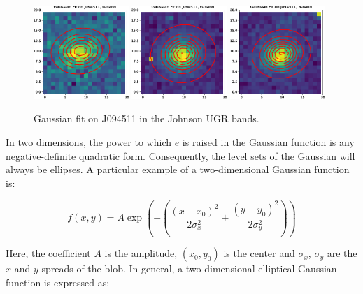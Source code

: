 \documentclass[a4paper,11pt]{article}
\begin{document}
\begin{figure}[H]
    \includegraphics[width=0.32\textwidth]{gauss_fit_wcs_U_stack.eps}
    \includegraphics[width=0.32\textwidth]{gauss_fit_wcs_G_stack.eps}
    \includegraphics[width=0.32\textwidth]{gauss_fit_wcs_R_stack.eps}
    \caption{Gaussian fit on J094511 in the Johnson UGR bands.}
    \label{fig:gauss_fit_wcs_stack}
\end{figure}

In two dimensions, the power to which $e$ is raised in the Gaussian function is
any negative-definite quadratic form.  Consequently, the level sets of the
Gaussian will always be ellipses. A particular example of a two-dimensional
Gaussian function is:

\begin{equation}
    f(x,y) = A \exp\left(- \left(\frac{(x-x_0)^2}{2\sigma_x^2} + \frac{(y-y_0)^2}{2\sigma_y^2} \right)\right)
\end{equation}

\noindent Here, the coefficient $A$ is the amplitude, $(x_0, y_0)$ is the center and
$\sigma_x$, $\sigma_y$ are the $x$ and $y$ spreads of the blob. In general, a
two-dimensional elliptical Gaussian function is expressed as:
\end{document}
